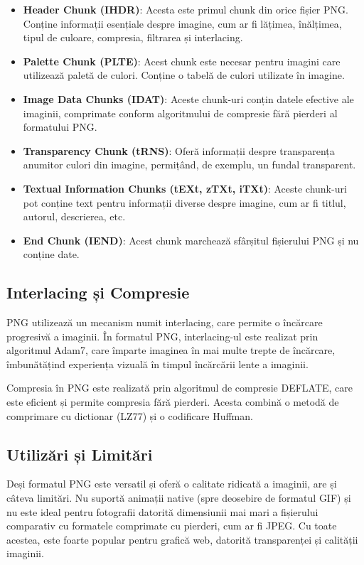 \documentclass[a4paper,12pt]{report}
\begin{document}
\begin{itemize}
  \item
  \textbf{Header Chunk (IHDR)}: Acesta este primul chunk din orice fișier PNG.
  Conține informații esențiale despre imagine, cum ar fi lățimea,
  înălțimea, tipul de culoare, compresia, filtrarea și interlacing.

  \item
  \textbf{Palette Chunk (PLTE)}: Acest chunk este necesar pentru imagini
  care utilizează paletă de culori.
  Conține o tabelă de culori utilizate în imagine.

  \item
  \textbf{Image Data Chunks (IDAT)}: Aceste chunk-uri conțin datele efective ale imaginii,
  comprimate conform algoritmului de compresie fără pierderi al formatului PNG.

  \item
  \textbf{Transparency Chunk (tRNS)}: Oferă informații despre transparența anumitor culori din imagine, 
  permițând, de exemplu, un fundal transparent.

  \item
  \textbf{Textual Information Chunks (tEXt, zTXt, iTXt)}: Aceste chunk-uri pot conține text
  pentru informații diverse despre imagine, cum ar fi titlul, autorul, descrierea, etc.

  \item
  \textbf{End Chunk (IEND)}: Acest chunk marchează sfârșitul fișierului PNG și nu conține date.
\end{itemize}

\subsection{Interlacing și Compresie}

PNG utilizează un mecanism numit interlacing, care permite o încărcare progresivă a imaginii.
În formatul PNG, interlacing-ul este realizat prin algoritmul Adam7,
care împarte imaginea în mai multe trepte de încărcare,
îmbunătățind experiența vizuală în timpul încărcării lente a imaginii.

Compresia în PNG este realizată prin algoritmul de compresie DEFLATE,
care este eficient și permite compresia fără pierderi.
Acesta combină o metodă de comprimare cu dictionar (LZ77) și o codificare Huffman.

\subsection{Utilizări și Limitări}

Deși formatul PNG este versatil și oferă o calitate ridicată a imaginii, are și câteva limitări.
Nu suportă animații native (spre deosebire de formatul GIF)
și nu este ideal pentru fotografii datorită dimensiunii mai mari a fișierului comparativ
cu formatele comprimate cu pierderi, cum ar fi JPEG.
Cu toate acestea, este foarte popular pentru grafică web,
datorită transparenței și calității imaginii.
\end{document}
